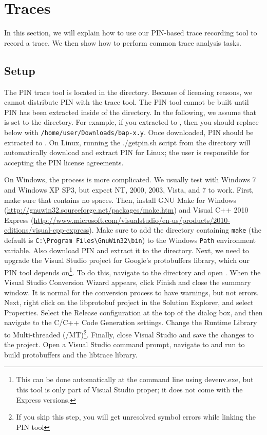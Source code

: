 \section{Traces}

In this section, we will explain how to use our PIN-based trace
recording tool to record a trace.  We then show how to perform common
trace analysis tasks.

\subsection{Setup}

The PIN trace tool is located in the  directory.
Because of licensing reasons, we cannot distribute PIN with the trace
tool.  The PIN tool cannot be built until PIN has been extracted
inside of the \bap directory.  In the following, we assume that
 is set to the \bap directory. For example, if you
extracted \bap to , then you should
replace  below with
\texttt{/home/user/Downloads/bap-x.y}. Once downloaded, PIN should be
extracted to .  On Linux, running the
./getpin.sh script from the 
directory will automatically download and extract PIN for Linux; the
user is responsible for accepting the PIN license agreements.

On Windows, the process is more complicated.  We usually test with
Windows 7 and Windows XP SP3, but expect NT, 2000, 2003, Vista, and 7
to work.  First, make sure that  contains no
spaces. Then, install GNU Make for Windows
(\url{http://gnuwin32.sourceforge.net/packages/make.htm}) and Visual
C++ 2010 Express
(\url{http://www.microsoft.com/visualstudio/en-us/products/2010-editions/visual-cpp-express}).
Make sure to add the directory containing \texttt{make} (the default
is \verb!C:\Program Files\GnuWin32\bin!) to the Windows \texttt{Path}
environment variable.  Also download PIN and extract it to the
 directory.  Next, we need to upgrade the Visual
Studio project for Google's protobuffers library, which our PIN tool
depends on\footnote{This can be done automatically at the command line
  using devenv.exe, but this tool is only part of Visual Studio
  proper; it does not come with the Express versions.}.  To do this,
navigate to the
 directory
and open .  When the Visual Studio Conversion
Wizard appears, click Finish and close the summary window.  It is
normal for the conversion process to have warnings, but not errors.
Next, right click on the libprotobuf project in the Solution Explorer,
and select Properties.  Select the Release configuration at the top of
the dialog box, and then navigate to the C/C++ Code Generation
settings.  Change the Runtime Library to Multi-threaded
(/MT)\footnote{If you skip this step, you will get unresolved symbol
  errors while linking the PIN tool}.  Finally, close Visual Studio
and save the changes to the project.  Open a Visual Studio command
prompt, navigate to 
and run  to build protobuffers and
the libtrace library.

